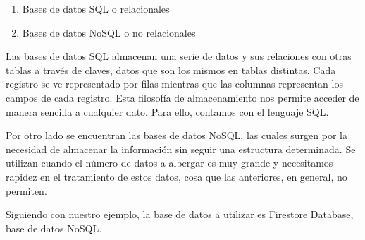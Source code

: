 	\begin{enumerate}
		\item Bases de datos SQL o relacionales
		\item Bases de datos NoSQL o no relacionales
	\end{enumerate}
	
	Las bases de datos SQL almacenan una serie de datos y sus relaciones con otras tablas a través de claves, datos que son los mismos en tablas distintas. Cada registro se ve representado por filas mientras que las columnas representan los campos de cada registro. Esta filosofía de almacenamiento nos permite acceder de manera sencilla a cualquier dato. Para ello, contamos con el lenguaje SQL.
	
	Por otro lado se encuentran las bases de datos NoSQL, las cuales surgen por la necesidad de almacenar la información sin seguir una estructura determinada. Se utilizan cuando el número de datos a albergar es muy grande y necesitamos rapidez en el tratamiento de estos datos, cosa que las anteriores, en general, no permiten.
	
	Siguiendo con nuestro ejemplo, la base de datos a utilizar es Firestore Database, base de datos NoSQL.
	